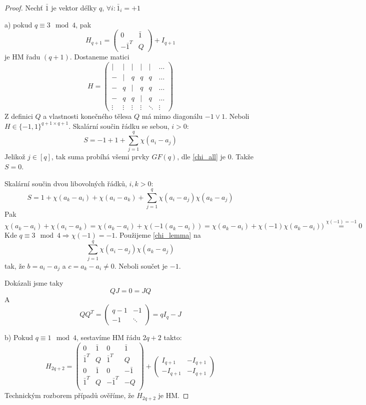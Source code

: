 \begin{proof}
	Nechť $\bar{1}$ je vektor délky $q$, $\forall i: \bar{1}_i = +1$

	a) pokud $q\equiv 3\mod 4$, pak
	\[ H_{q + 1} = \begin{pmatrix} 0 & \bar{1} \\ -\bar{1}^T & Q \end{pmatrix} + I_{q + 1} \]
	je HM řadu $(q + 1)$.
	Dostaneme matici
	\[ H = \begin{pmatrix}
		| & | & | & | & | & \ldots \\
		- & | & q & q & q & \ldots \\
		- & q & | & q & q & \ldots\\
		- & q & q & | & q & \ldots \\
		\vdots & \vdots & \vdots & \vdots & \ddots & \vdots
	      \end{pmatrix}
	\]
	Z definici $Q$ a vlastnosti konečného tělesa $Q$ má mimo diagonálu $-1 \lor 1$.
	Neboli $H \in \{ -1, 1 \}^{q + 1 \times q + 1}$.
	Skalární součin řádku se sebou, $i > 0$:
	\[ S = -1 + 1 + \sum_{j = 1}^q \chi(a_i - a_j) \]
	Jelikož $j \in [q]$, tak suma probíhá všemi prvky $GF(q)$, dle \eqref{chi_all} je 0.
	Takže $S = 0$.

	Skalární součin dvou libovolných řádků, $i, k > 0$:
	\[ S = 1 + \chi(a_k - a_i) + \chi(a_i - a_k) + \sum_{j = 1}^q \chi(a_i - a_j) \chi(a_k - a_j) \]
	Pak
	\[ \chi(a_k - a_i) + \chi(a_i - a_k) = \chi(a_k - a_i) + \chi(-1(a_k - a_i)) = \chi(a_k - a_i) + \chi(-1)\chi(a_k - a_i)) \stackrel{\chi(-1) = -1}{=} 0 \]
	Kde $q \equiv 3 \mod 4 \Rightarrow \chi(-1) = -1$.
	Použijeme \cref{chi_lemma} na
	\[ \sum_{j = 1}^q \chi(a_i - a_j) \chi(a_k - a_j) \]
	tak, že $b = a_i - a_j$ a $c = a_k - a_i \ne 0$.
	Neboli součet je $-1$.

	Dokázali jsme taky
	\[ QJ = 0 = JQ \]
	A
	\[ QQ^T = \begin{pmatrix} q - 1 & -1 \\ -1 & \ddots \end{pmatrix} = qI_q - J \]

	b) Pokud $q\equiv 1\mod 4$, sestavíme HM řádu $2q+2$ takto:
	\[ H_{2q + 2} = \begin{pmatrix}
		0 & \bar{1} & 0 & \bar{1} \\
		\bar{1}^T & Q & \bar{1}^T & Q \\
		0 & \bar{1} & 0 &- \bar{1} \\
		\bar{1}^T & Q & -\bar{1}^T & -Q \\
	      \end{pmatrix}
	+ \begin{pmatrix} I_{q + 1} & -I_{q + 1}\\ -I_{q + 1} & -I_{q + 1} \end{pmatrix}
	\]
	Technickým rozborem případů ověříme, že $H_{2q + 2}$ je HM.
\end{proof}

